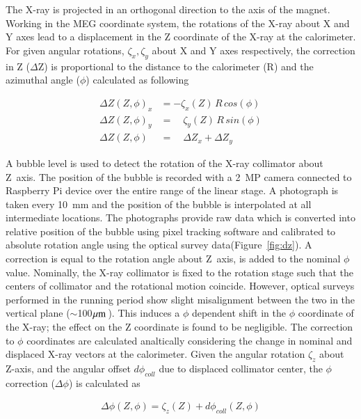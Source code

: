     The X-ray is projected in an orthogonal direction to the axis of the
    magnet. Working in the MEG coordinate system, the rotations of the
    X-ray about X and Y axes lead to a displacement in the Z coordinate of
    the X-ray at the calorimeter. For given angular rotations,
    $\zeta_x,\zeta_y$ about X and Y axes respectively, the correction in Z
    ($\Delta$Z) is proportional to the distance to the calorimeter (R) and
    the azimuthal angle ($\phi$) calculated as following

    \begin{align}
      \Delta Z(Z,\phi)_x &= -\zeta_x(Z)\,R\,cos(\phi)     \\
      \Delta Z(Z,\phi)_y &= \quad \zeta_y(Z)\,R\,sin(\phi) \\
      \Delta Z(Z,\phi)\  &= \quad \Delta Z_x + \Delta Z_y
    \end{align}

  A bubble level is used to detect the rotation of the X-ray
  collimator about Z~axis.  The position of the bubble is recorded
  with a 2~MP camera connected to Raspberry Pi device over the entire
  range of the linear stage.  A photograph is taken every 10~mm and
  the position of the bubble is interpolated at all intermediate
  locations. The photographs provide raw data which is converted into
  relative position of the bubble using pixel tracking
  software\cite{imagej} and calibrated to absolute rotation angle
  using the optical survey data(Figure~\ref{fig:dz}).  A
  correction is equal to the rotation angle about Z~axis, is added to
  the nominal $\phi$ value. Nominally, the X-ray collimator is fixed
  to the rotation stage    such that the centers of collimator and the
  rotational motion     coincide. However, optical surveys performed
  in the running period     show slight misalignment between the two
  in the vertical plane     ($\sim$100$\mathrm{\hspace{0.3 mm}\mu m\hspace{0.5 mm}}$).  This induces a
  $\phi$ dependent shift in the     $\phi$ coordinate of the X-ray;
  the effect on the Z coordinate is     found to be negligible. The
  correction to $\phi$ coordinates are calculated analtically
  considering the change in nominal and     displaced X-ray vectors at
  the calorimeter. Given the angular     rotation $\zeta_z$ about
  Z-axis, and the angular offset $d\phi_{coll}$     due to displaced
  collimator center, the $\phi$ correction      ($\Delta\phi$) is
  calculated as 

  \begin{align} 
  \Delta \phi (Z,\phi) = \zeta_z(Z)+d\phi_{coll}(Z,\phi) 
  \end{align}

